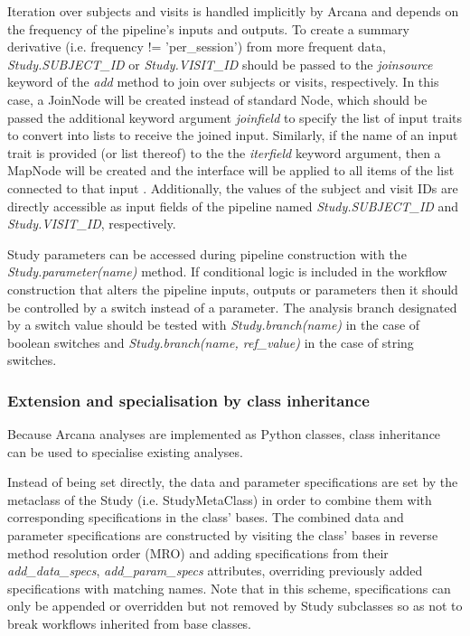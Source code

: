 \documentclass[smallextended]{svjour3}       %
\begin{document}
Iteration over subjects and visits is handled implicitly by Arcana and
depends on the frequency of the pipeline's inputs and outputs. To create
a summary derivative (i.e. frequency != 'per\_session') from more frequent
data, \emph{Study.SUBJECT\_ID} or \emph{Study.VISIT\_ID} should be
passed to the \emph{joinsource} keyword of the \emph{add} method to join over subjects or visits, respectively.
In this case, a JoinNode will be created instead of standard Node,
which should be passed the additional keyword argument \emph{joinfield} to
specify the list of input traits to convert into lists to receive the joined input.
Similarly, if the name of an input trait is provided (or list thereof) to the the \emph{iterfield}
keyword argument, then a MapNode will be created and the interface will
be applied to all items of the list connected to that input \citep{gorgolewski_nipype:_2011}.
Additionally, the values of the subject and visit IDs are directly accessible as input fields of the pipeline
named \emph{Study.SUBJECT\_ID} and \emph{Study.VISIT\_ID}, respectively.

Study parameters can be accessed during pipeline construction with the
\emph{Study.parameter(name)} method. If conditional logic is included in
the workflow construction that alters the pipeline inputs, outputs or
parameters then it should be controlled by a switch instead of a
parameter. The analysis branch designated by a switch value should be
tested with \emph{Study.branch(name)} in the case of boolean switches and
\emph{Study.branch(name, ref\_value)} in the case of string switches.

\subsubsection*{Extension and specialisation by class inheritance}
\label{extension-and-specialisation-by-class-inheritance}

Because Arcana analyses are implemented as Python classes, class
inheritance can be used to specialise existing analyses.

Instead of being set directly, the data and parameter specifications are set
by the metaclass of the Study (i.e. StudyMetaClass)
in order to combine them with corresponding specifications in the class' bases. The combined
data and parameter specifications are constructed by visiting the class'
bases in reverse method resolution order (MRO) and adding specifications
from their \emph{add\_data\_specs}, \emph{add\_param\_specs} attributes,
overriding previously added specifications with matching names. Note
that in this scheme, specifications can only be appended or overridden
but not removed by Study subclasses so as not to break workflows
inherited from base classes.
\end{document}
